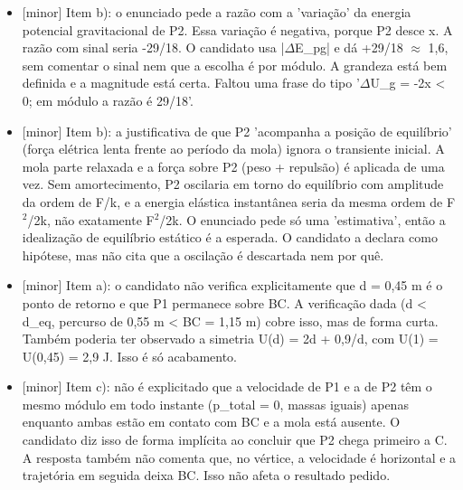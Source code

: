 \documentclass{article}%
\begin{document}
\begin{itemize}%
\item%
{[}minor{]} Item b): o enunciado pede a razão com a 'variação' da energia potencial gravitacional de P2. Essa variação é negativa, porque P2 desce x. A razão com sinal seria -29/18. O candidato usa |$\Delta$E\_pg| e dá +29/18 $\approx$ 1,6, sem comentar o sinal nem que a escolha é por módulo. A grandeza está bem definida e a magnitude está certa. Faltou uma frase do tipo '$\Delta$U\_g = -2x < 0; em módulo a razão é 29/18'.%
\item%
{[}minor{]} Item b): a justificativa de que P2 'acompanha a posição de equilíbrio' (força elétrica lenta frente ao período da mola) ignora o transiente inicial. A mola parte relaxada e a força sobre P2 (peso + repulsão) é aplicada de uma vez. Sem amortecimento, P2 oscilaria em torno do equilíbrio com amplitude da ordem de F/k, e a energia elástica instantânea seria da mesma ordem de F$^2$/2k, não exatamente F$^2$/2k. O enunciado pede só uma 'estimativa', então a idealização de equilíbrio estático é a esperada. O candidato a declara como hipótese, mas não cita que a oscilação é descartada nem por quê.%
\item%
{[}minor{]} Item a): o candidato não verifica explicitamente que d = 0,45 m é o ponto de retorno e que P1 permanece sobre BC. A verificação dada (d < d\_eq, percurso de 0,55 m < BC = 1,15 m) cobre isso, mas de forma curta. Também poderia ter observado a simetria U(d) = 2d + 0,9/d, com U(1) = U(0,45) = 2,9 J. Isso é só acabamento.%
\item%
{[}minor{]} Item c): não é explicitado que a velocidade de P1 e a de P2 têm o mesmo módulo em todo instante (p\_total = 0, massas iguais) apenas enquanto ambas estão em contato com BC e a mola está ausente. O candidato diz isso de forma implícita ao concluir que P2 chega primeiro a C. A resposta também não comenta que, no vértice, a velocidade é horizontal e a trajetória em seguida deixa BC. Isso não afeta o resultado pedido.%
\end{itemize}%
\end{document}
